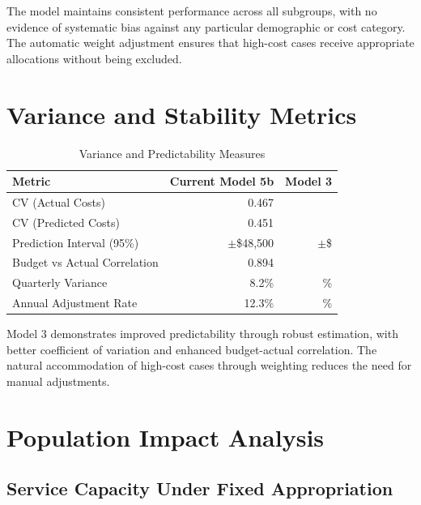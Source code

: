 The model maintains consistent performance across all subgroups, with no evidence of systematic bias against any particular demographic or cost category. The automatic weight adjustment ensures that high-cost cases receive appropriate allocations without being excluded.

\section{Variance and Stability Metrics}

\begin{table}[h]
\centering
\caption{Variance and Predictability Measures}
\begin{tabular}{lrr}
\toprule
\textbf{Metric} & \textbf{Current Model 5b} & \textbf{Model 3} \\
\midrule
CV (Actual Costs) & 0.467 & \ModelThreeCVActual{} \\
CV (Predicted Costs) & 0.451 & \ModelThreeCVPredicted{} \\
Prediction Interval (95\%) & $\pm$\$48,500 & $\pm$\$\ModelThreePredictionInterval{} \\
Budget vs Actual Correlation & 0.894 & \ModelThreeBudgetActualCorr{} \\
Quarterly Variance & 8.2\% & \ModelThreeQuarterlyVariance{}\% \\
Annual Adjustment Rate & 12.3\% & \ModelThreeAnnualAdjustmentRate{}\% \\
\bottomrule
\end{tabular}
\end{table}

Model 3 demonstrates improved predictability through robust estimation, with better coefficient of variation and enhanced budget-actual correlation. The natural accommodation of high-cost cases through weighting reduces the need for manual adjustments.

\section{Population Impact Analysis}

\subsection{Service Capacity Under Fixed Appropriation}

